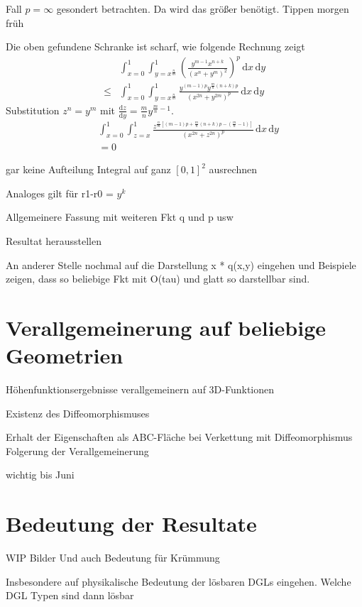 \documentclass[10pt,a4paper,oneside]{report}
\begin{document}
Fall $p = \infty$ gesondert betrachten. Da wird das größer benötigt.
Tippen morgen früh

Die oben gefundene Schranke ist scharf, wie folgende Rechnung zeigt
\begin{align*}
&\int_{x=0}^{1} \int_{y=x^{\frac{n}{m}}}^{1} \left( \frac{y^{m-1}x^{n+k}}{\left(x^n+y^m\right)^2} \right)^p \, \mathrm{d}x \, \mathrm{d}y \\
\leq &\int_{x=0}^{1} \int_{y=x^{\frac{n}{m}}}^{1} \frac{y^{\left(m-1\right)p}y^{\frac{m}{n}\left(n+k\right)p}}{\left(x^{2n}+y^{2m}\right)^p}  \, \mathrm{d}x \, \mathrm{d}y 
\end{align*}
Substitution $z^n = y^m$ mit $\frac{\mathrm{d}z}{\mathrm{d}y} = \frac{m}{n} y^{\frac{m}{n} - 1}$.
\begin{align*}
&\int_{x=0}^{1} \int_{z=x}^{1} \frac{z^{\frac{n}{m}\left[\left(m-1\right)p+\frac{m}{n}\left(n+k\right)p - \left(\frac{m}{n}-1\right)\right]}}{\left(x^{2n}+z^{2n}\right)^p}  \, \mathrm{d}x \, \mathrm{d}y \\
&= 0
\end{align*}

gar keine Aufteilung Integral auf ganz $[0,1]^2$ ausrechnen

Analoges gilt für r1-r0 = $y^k$

Allgemeinere Fassung mit weiteren Fkt q und p usw

Resultat herausstellen

An anderer Stelle nochmal auf die Darstellung x * q(x,y) eingehen und Beispiele zeigen, dass so beliebige Fkt mit O(tau) und glatt so darstellbar sind.

\chapter{Verallgemeinerung auf beliebige Geometrien}
Höhenfunktionsergebnisse verallgemeinern auf 3D-Funktionen

Existenz des Diffeomorphismuses

Erhalt der Eigenschaften als ABC-Fläche bei Verkettung mit Diffeomorphismus
Folgerung der Verallgemeinerung


wichtig bis Juni

\chapter{Bedeutung der Resultate}
WIP
Bilder
Und auch Bedeutung für Krümmung

Insbesondere auf physikalische Bedeutung der lösbaren DGLs eingehen. Welche DGL Typen sind dann lösbar
\end{document}
